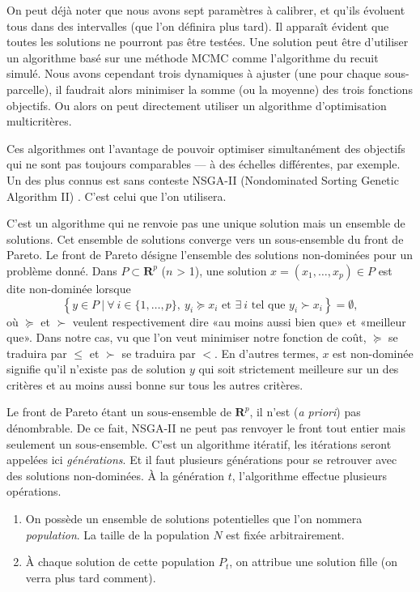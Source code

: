 On peut déjà noter que nous avons sept paramètres à calibrer, et qu'ils évoluent tous dans des intervalles (que l'on définira plus tard).
Il apparaît évident que toutes les solutions ne pourront pas être testées.
Une solution peut être d'utiliser un algorithme basé sur une méthode MCMC comme l'algorithme du recuit simulé.
Nous avons cependant trois dynamiques à ajuster (une pour chaque sous-parcelle), il faudrait alors minimiser la somme (ou la moyenne) des trois fonctions objectifs.
Ou alors on peut directement utiliser un algorithme d'optimisation multicritères.

Ces algorithmes ont l'avantage de pouvoir optimiser simultanément des objectifs qui ne sont pas toujours comparables --- à des échelles différentes, par exemple.
Un des plus connus est sans conteste NSGA-II (Nondominated Sorting Genetic Algorithm II) \citep{deb}.
C'est celui que l'on utilisera.

C'est un algorithme qui ne renvoie pas une unique solution mais un ensemble de solutions. 
Cet ensemble de solutions converge vers un sous-ensemble du front de Pareto.
Le front de Pareto désigne l'ensemble des solutions non-dominées pour un problème donné.
Dans $P \subset \mathbf{R}^{p}$ ($n$ > 1), une solution $x = \left( x_1, \ldots, x_p \right) \in  P$ est dite non-dominée lorsque
\[
\left\{ y \in P\ |\ \forall\ i \in \{1, \ldots, p\},\ y_i \succcurlyeq x_i \text{ et } \exists\ i \text{ tel que } y_i \succ x_i \right\} = \emptyset,
\]
où $\succcurlyeq$ et $\succ$ veulent respectivement dire «au moins aussi bien que» et «meilleur que». 
Dans notre cas, vu que l'on veut minimiser notre fonction de coût, $\succcurlyeq$ se traduira par $\leq$ et $\succ$ se traduira par $<$.
En d'autres termes, $x$ est non-dominée signifie qu'il n'existe pas de solution $y$ qui soit strictement meilleure sur un des critères et au moins aussi bonne sur tous les autres critères.

Le front de Pareto étant un sous-ensemble de $\mathbf{R}^{p}$, il n'est (\emph{a priori}) pas dénombrable.
De ce fait, NSGA-II ne peut pas renvoyer le front tout entier mais seulement un sous-ensemble.
C'est un algorithme itératif, les itérations seront appelées ici \emph{générations}.
Et il faut plusieurs générations pour se retrouver avec des solutions non-dominées.
À la génération $t$, l'algorithme effectue plusieurs opérations.
\begin{enumerate}
 \item On possède un ensemble de solutions potentielles que l'on nommera \emph{population}.
 La taille de la population $N$ est fixée arbitrairement.
 \item À chaque solution de cette population $P_t$, on attribue une solution fille (on verra plus tard comment). 
\end{enumerate}

